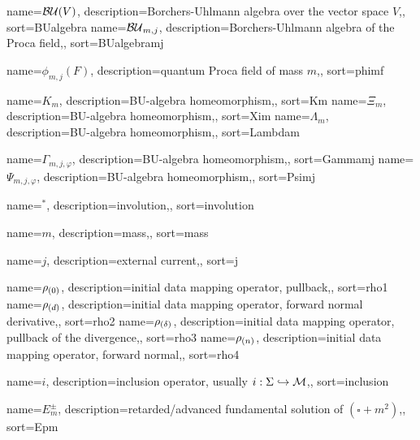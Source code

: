 {
	name=\ensuremath{\BU(V)},
	description={Borchers-Uhlmann algebra over the vector space $V$,},
	sort={BUalgebra}
}
{
	name=\ensuremath{\BUmj},
	description={Borchers-Uhlmann algebra of the Proca field,},
	sort={BUalgebramj}
}

{
	name=\ensuremath{\phi_{m,j}(F) },
	description={quantum Proca field of mass $m$,},
	sort={phimf}
}




{
	name=\ensuremath{K_m },
	description={BU-algebra homeomorphism,},
	sort={Km}
}
{
	name=\ensuremath{\Xi_m },
	description={BU-algebra homeomorphism,},
	sort={Xim}
}
{
	name=\ensuremath{\Lambda_m },
	description={BU-algebra homeomorphism,},
	sort={Lambdam}
}

{
	name=\ensuremath{\Gamma_{m,j,\varphi}},
	description={BU-algebra homeomorphism,},
	sort={Gammamj}
}
{
	name=\ensuremath{\Psi_{m,j,\varphi}},
	description={BU-algebra homeomorphism,},
	sort={Psimj}
}

{
	name=\ensuremath{^*},
	description={involution,},
	sort={involution}
}




{
	name=\ensuremath{m},
	description={mass,},
	sort={mass}
}


{
	name=\ensuremath{j},
	description={external current,},
	sort={j}
}



{
	name=\ensuremath{\rhoz},
	description={initial data mapping operator, pullback,},
	sort={rho1}
}
{
	name=\ensuremath{\rhod},
	description={initial data mapping operator, forward normal derivative,},
	sort={rho2}
}
{
	name=\ensuremath{\rhodelta},
	description={initial data mapping operator, pullback of the divergence,},
	sort={rho3}
}
{
	name=\ensuremath{\rhon},
	description={initial data mapping operator, forward normal,},
	sort={rho4}
}

{
	name=\ensuremath{i},
	description={inclusion operator, usually $i:\Sigma \hookrightarrow \mathcal{M}$,},
	sort={inclusion}
}


{
	name=\ensuremath{E_m^\pm},
	description={retarded/advanced fundamental solution of $(\square + m^2)$,},
	sort={Epm}
}

